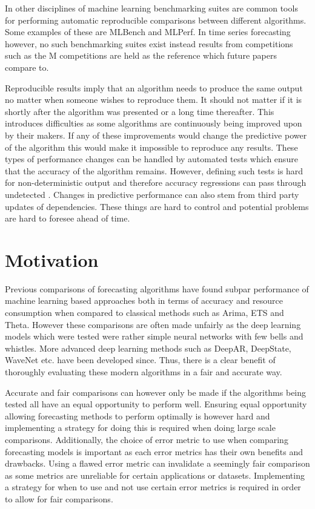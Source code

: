 In other disciplines of machine learning benchmarking suites are common tools for performing automatic reproducible comparisons between different algorithms. Some examples of these are MLBench and MLPerf. In time series forecasting however, no such benchmarking suites exist instead results from competitions such as the M competitions  are held as the reference which future papers compare to.

Reproducible results imply that an algorithm needs to produce the same output no matter when someone wishes to reproduce them. It should not matter if it is shortly after the algorithm was presented or a long time thereafter. This introduces difficulties as some algorithms are continuously being improved upon by their makers. If any of these improvements would change the predictive power of the algorithm this would make it impossible to reproduce any results. These types of performance changes can be handled by automated tests which ensure that the accuracy of the algorithm remains. However, defining such tests is hard for non-deterministic output and therefore accuracy regressions can pass through undetected \cite{gluonts_deepar_github_issue}. Changes in predictive performance can also stem from third party updates of dependencies. These things are hard to control and potential problems are hard to foresee ahead of time.



\section{Motivation}
Previous comparisons of forecasting algorithms have found subpar performance of machine learning based approaches both in terms of accuracy and resource consumption when compared to classical methods such as Arima, ETS and Theta. However these comparisons are often made unfairly as the deep learning models which were tested were rather simple neural networks with few bells and whistles. More advanced deep learning methods such as DeepAR, DeepState, WaveNet etc. have been developed since. Thus, there is a clear benefit of thoroughly evaluating these modern algorithms in a fair and accurate way.

Accurate and fair comparisons can however only be made if the algorithms being tested all have an equal opportunity to perform well. Ensuring equal opportunity allowing forecasting methods to perform optimally is however hard and implementing a strategy for doing this is required when doing large scale comparisons. Additionally, the choice of error metric to use when comparing forecasting models is important as each error metrics has their own benefits and drawbacks. Using a flawed error metric can invalidate a seemingly fair comparison as some metrics are unreliable for certain applications or datasets. Implementing a strategy for when to use and not use certain error metrics is required in order to allow for fair comparisons.

